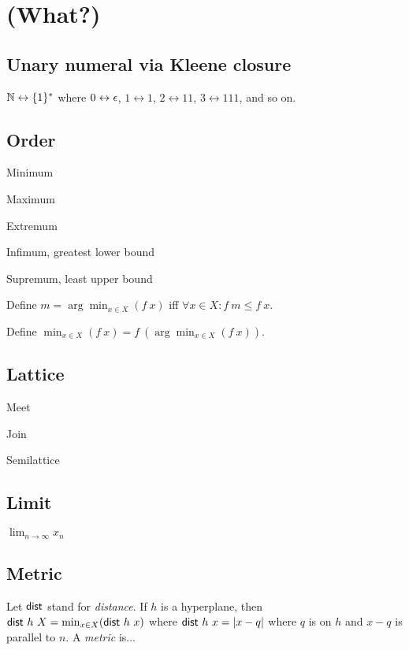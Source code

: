 \chapter{(What?)}

\section{Unary numeral via Kleene closure}

\(\mathbb{N} \leftrightarrow \{1\}^*\)
where \(0 \leftrightarrow \epsilon\), \(1 \leftrightarrow 1\), \(2 \leftrightarrow 11\), \(3 \leftrightarrow 111\), and so on.

\section{Order}

Minimum

Maximum

Extremum

Infimum, greatest lower bound

Supremum, least upper bound

%
Define \(m = \arg\min_{x \in X}(f~x)\) iff \(\forall x \in X : f~m \le f~x\).

%
Define \(\min_{x \in X}(f~x) = f~(\arg\min_{x \in X}(f~x))\).

\section{Lattice}

Meet

Join

Semilattice

\section{Limit}

\(\lim_{n \to \infty} x_n\)

\section{Metric}

%
%
Let \(\textsf{dist}\) stand for \emph{distance}.
If \(h\) is a hyperplane,
then \(\textsf{dist}~h~X = \min_{x \in X} (\textsf{dist}~h~x)\)
where \(\textsf{dist}~h~x = |x-q|\) where \(q\) is on \(h\) and \(x-q\) is parallel to \(n\).
%
A \emph{metric} is...

